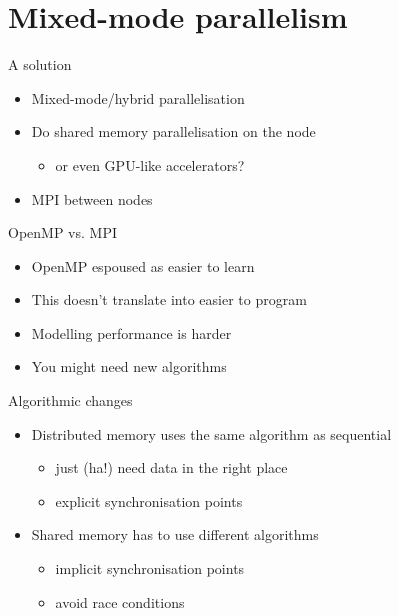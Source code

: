 \documentclass[bigger]{beamer}
\begin{document}
\section{Mixed-mode parallelism}
\label{sec:orgheadline9}
\begin{frame}[label={sec:orgheadline6}]{A solution}
\begin{itemize}
\item Mixed-mode/hybrid parallelisation
\item Do shared memory parallelisation on the node
\begin{itemize}
\item or even GPU-like accelerators?
\end{itemize}
\item MPI between nodes
\end{itemize}
\end{frame}

\begin{frame}[label={sec:orgheadline7}]{OpenMP vs. MPI}
\begin{itemize}
\item OpenMP espoused as easier to learn
\item This doesn't translate into easier to program
\item Modelling performance is harder
\item You might need new algorithms
\end{itemize}
\end{frame}

\begin{frame}[label={sec:orgheadline8}]{Algorithmic changes}
\begin{itemize}
\item Distributed memory uses the same algorithm as sequential
\begin{itemize}
\item just (ha!) need data in the right place
\item explicit synchronisation points
\end{itemize}
\item Shared memory has to use different algorithms
\begin{itemize}
\item implicit synchronisation points
\item avoid race conditions
\end{itemize}
\end{itemize}
\end{frame}
\end{document}
